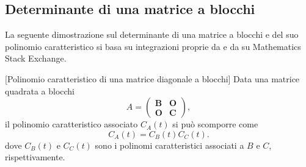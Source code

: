 \subsection{Determinante di una matrice a blocchi}
La seguente dimostrazione sul determinante di una matrice a blocchi e del suo polinomio caratteristico si basa su integrazioni proprie da \cite{jeanmarie:blockdet} e da \cite{bengrossman:blockdet} su Mathematics Stack Exchange. \label{dimostrazionedeterminantematriceblocchi}
\begin{proposition}{}[Polinomio caratteristico di una matrice diagonale a blocchi]
	Data una matrice quadrata a blocchi
	\begin{equation*}
		A=\left(
		\begin{array}{c|c}
			\mathbf{B} & \mathbf{O}\\
			\hline
			\mathbf{O} & \mathbf{C}
		\end{array}
		\right),
	\end{equation*}
	il polinomio caratteristico associato $C_A(t)$ si può scomporre come
	\begin{equation*}
		C_A(t)=C_B(t)C_C(t).
	\end{equation*}
	dove $C_B(t)$ e $C_C(t)$ sono i polinomi caratteristici associati a $B$ e $C$, rispettivamente.
\end{proposition}
